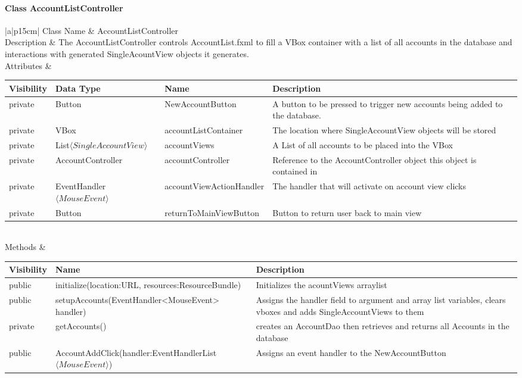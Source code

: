 \documentclass[12pt]{article}
\begin{document}
\paragraph{Class AccountListController}
\begin{table}[H]
	\begin{tabular}{|a|p{15cm}|}
		\hline
		{Class Name} & {AccountListController} \\
		\hline
		Description & The AccountListController controls AccountList.fxml to fill a VBox container with a list of all accounts in the database and interactions with generated SingleAcountView objects it generates.\\
		\hline
		Attributes & 
		\begin{tabular}{| p{1.5cm} | p{5cm} | p{3.5cm} | p{3.45cm} |}
			\hline
			\rowcolor{lightgray}
			Visibility & Data Type & Name & Description \\
			\hline
			\rowcolor{white}
			private & Button & NewAccountButton & A button to be pressed to trigger new accounts being added to the database.\\
			\hline
			private & VBox & accountListContainer & The location where SingleAccountView objects will be stored\\
			\hline
			private & List$\langle SingleAccountView \rangle$  & accountViews & A List of all accounts to be placed into the VBox\\	
			\hline	
			private & AccountController & accountController & Reference to the AccountController object this object is contained in\\
			\hline
			private&  EventHandler $\langle MouseEvent \rangle$ & accountViewActionHandler& The handler that will activate on account view clicks\\
			\hline
			private &Button & returnToMainViewButton & Button to return user back to main view\\
			\hline
		\end{tabular} \\
		\hline
		Methods & 		 
		\begin{tabular}{| p{2cm} | p{5cm} | p{6.9cm} |}
			\hline
			\rowcolor{gray}
			{Visibility} &{Name} & {Description} \\
			\hline
			\rowcolor{white}			
			public &  initialize(location:URL, resources:ResourceBundle) & Initializes the acountViews arraylist\\
			\hline
			public &  setupAccounts(EventHandler<MouseEvent> handler) &  Assigns the handler field to argument and array list variables, clears vboxes and adds SingleAccountViews to them\\
			\hline
			private &  getAccounts() & creates an AccountDao then retrieves and returns all Accounts in the database\\
			\hline		
			public &  AccountAddClick(handler:EventHandlerList$\langle MouseEvent \rangle$) & Assigns an event handler to the NewAccountButton\\
			\hline	
		\end{tabular}								 
	\end{tabular}
\end{table}
\end{document}
